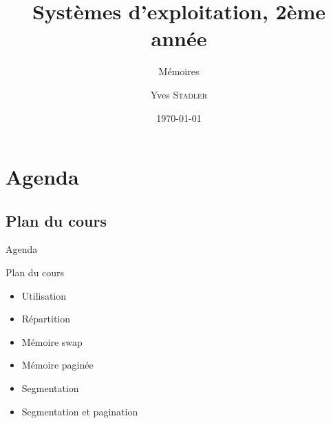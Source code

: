 \title{Systèmes d'exploitation, 2ème année}
\subtitle{Mémoires}

\author{Yves \textsc{Stadler}}

\date{\today}




\begin{frame}
\titlepage
\end{frame}

\def\sectitle{Agenda}
\section{\sectitle}
\def\subsectitle{Plan du cours}
\subsection{\subsectitle}

\begin{frame}{\sectitle}
\begin{block}{\subsectitle}
\begin{itemize}
    \item Utilisation
    \item Répartition
    \item Mémoire swap
    \item Mémoire paginée
    \item Segmentation
    \item Segmentation et pagination
\end{itemize}
\end{block}
\end{frame}

\def\sectitle{Utilisation de la mémoire}

